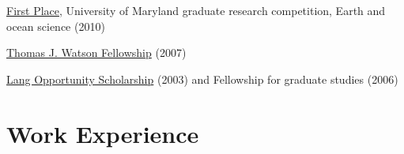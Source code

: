 \documentclass[10pt,letterpaper]{article}
\renewenvironment{itemize}{
  \begin{list}{}{
    \setlength{\leftmargin}{1.5em}
    \setlength{\itemsep}{0.25em}
    \setlength{\parskip}{0pt}
    \setlength{\parsep}{0.25em}
  }
}{
  \end{list}
}
\begin{document}
\begin{itemize}
  \item \href{http://geog.umd.edu/sites/geog.umd.edu/files/Geograffiti_Summer_2010.pdf}{First Place}, University of Maryland graduate research competition, Earth and ocean science (2010)
  \item \href{https://watson.foundation}{Thomas J. Watson Fellowship} (2007)
  \item \href{http://www.swarthmore.edu/lang-center-civic-social-responsibility/lang-opportunity-scholarship-los-program}{Lang Opportunity Scholarship} (2003) and Fellowship for graduate studies (2006)
\end{itemize}

\section*{Work Experience}
\end{document}

